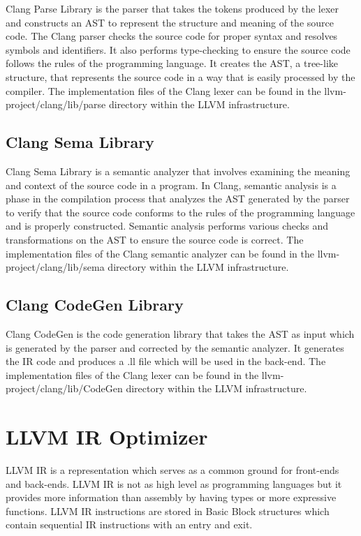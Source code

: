 Clang Parse Library is the parser that takes the tokens produced by the lexer and constructs an AST to represent the structure and meaning of the source code. The Clang parser checks the source code for proper syntax and resolves symbols and identifiers. It also performs type-checking to ensure the source code follows the rules of the programming language. It creates the AST, a tree-like structure, that represents the source code in a way that is easily processed by the compiler. The implementation files of the Clang lexer can be found in the llvm-project/clang/lib/parse directory within the LLVM infrastructure.

\subsection{Clang Sema Library}

Clang Sema Library is a semantic analyzer that involves examining the meaning and context of the source code in a program. In Clang, semantic analysis is a phase in the compilation process that analyzes the AST generated by the parser to verify that the source code conforms to the rules of the programming language and is properly constructed. Semantic analysis performs various checks and transformations on the AST to ensure the source code is correct. The implementation files of the Clang semantic analyzer can be found in the llvm-project/clang/lib/sema directory within the LLVM infrastructure.

\subsection{Clang CodeGen Library}

Clang CodeGen is the code generation library that takes the AST as input which is generated by the parser and corrected by the semantic analyzer. It generates the IR code and produces a .ll file which will be used in the back-end. The implementation files of the Clang lexer can be found in the llvm-project/clang/lib/CodeGen directory within the LLVM infrastructure. 

\section{LLVM IR Optimizer}\label{sec:opt}
LLVM IR is a representation which serves as a common ground for front-ends and back-ends. LLVM IR is not as high level as programming languages but it provides more information than assembly by having types or more expressive functions. LLVM IR instructions are stored in Basic Block structures which contain sequential IR instructions with an entry and exit. 

